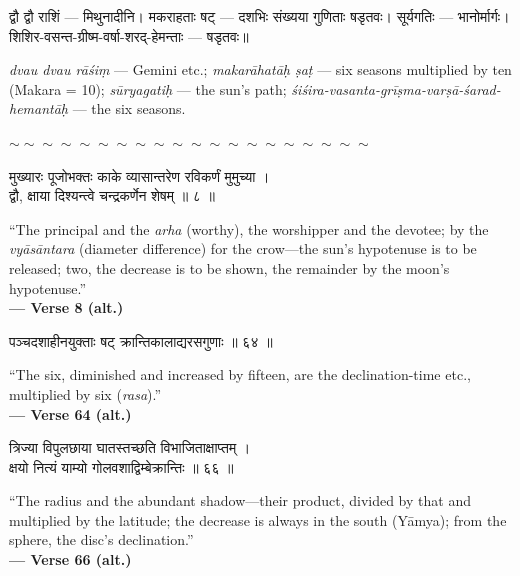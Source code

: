 \documentclass[11pt,a4paper]{article}
\newcommand{\dev}[1]{{\devanagarifont #1}}
\newenvironment{bilingualverse}{%
  \begin{paracol}{2}
  \fontsize{10.5}{13}\selectfont
}{%
  \end{paracol}
  \vspace{0.3cm}
}
\newcommand{\wavydivider}{\begin{center}$\sim\sim\sim\sim\sim\sim\sim\sim\sim\sim\sim\sim\sim\sim\sim\sim\sim\sim\sim\sim$\end{center}}
\newenvironment{paracol}[1]{\begingroup}{\endgroup}
\newenvironment{leftcolumn*}{\begingroup}{\endgroup}
\newenvironment{rightcolumn}{\begingroup}{\endgroup}
\begin{document}
\begin{paracol}{2}
\begin{leftcolumn*}
\dev{द्वौ द्वौ राशिं} — मिथुनादीनि। \dev{मकराहताः षट्} — दशभिः संख्यया गुणिताः षडृतवः। \dev{सूर्यगतिः} — भानोर्मार्गः। \dev{शिशिर-वसन्त-ग्रीष्म-वर्षा-शरद्-हेमन्ताः} — षडृतवः॥
\end{leftcolumn*}
\begin{rightcolumn}
\textit{dvau dvau rāśiṃ} --- Gemini etc.; \textit{makarāhatāḥ ṣaṭ} --- six seasons multiplied by ten (Makara = 10); \textit{sūryagatiḥ} --- the sun's path; \textit{śiśira-vasanta-grīṣma-varṣā-śarad-hemantāḥ} --- the six seasons.
\end{rightcolumn}
\end{paracol}

\vspace{0.3cm}

\wavydivider

\begin{bilingualverse}
\begin{leftcolumn*}
\dev{मुख्यारः पूजोभक्तः काके व्यासान्तरेण रविकर्णं मुमुच्या ।}\\
\dev{द्वौ, क्षाया दिश्यन्त्वे चन्द्रकर्णेन शेषम् ॥ ८ ॥}
\end{leftcolumn*}
\begin{rightcolumn}
``The principal and the \textit{arha} (worthy), the worshipper and the devotee; by the \textit{vyāsāntara} (diameter difference) for the crow---the sun's hypotenuse is to be released; two, the decrease is to be shown, the remainder by the moon's hypotenuse.''\\[0.3cm]
\hfill\textbf{— Verse 8 (alt.)}
\end{rightcolumn}
\end{bilingualverse}

\begin{bilingualverse}
\begin{leftcolumn*}
\dev{पञ्चदशाहीनयुक्ताः षट् क्रान्तिकालाद्यरसगुणाः ॥ ६४ ॥}
\end{leftcolumn*}
\begin{rightcolumn}
``The six, diminished and increased by fifteen, are the declination-time etc., multiplied by six (\textit{rasa}).''\\[0.3cm]
\hfill\textbf{— Verse 64 (alt.)}
\end{rightcolumn}
\end{bilingualverse}

\begin{bilingualverse}
\begin{leftcolumn*}
\dev{त्रिज्या विपुलछाया घातस्तच्छति विभाजिताक्षाप्तम् ।}\\
\dev{क्षयो नित्यं याम्यो गोलवशाद्विम्बेक्रान्तिः ॥ ६६ ॥}
\end{leftcolumn*}
\begin{rightcolumn}
``The radius and the abundant shadow---their product, divided by that and multiplied by the latitude; the decrease is always in the south (Yāmya); from the sphere, the disc's declination.''\\[0.3cm]
\hfill\textbf{— Verse 66 (alt.)}
\end{rightcolumn}
\end{bilingualverse}
\end{document}
